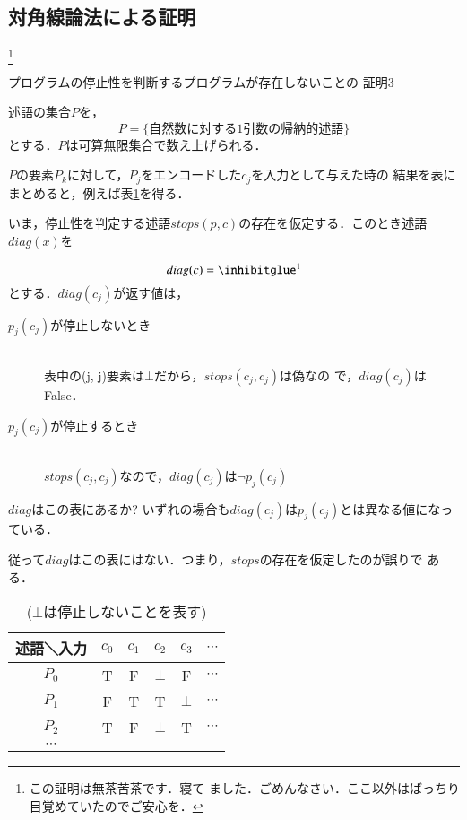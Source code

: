 \subsection{対角線論法による証明} \footnote{この証明は無茶苦茶です．寝て
ました．ごめんなさい．ここ以外はばっちり目覚めていたのでご安心を．}
\begin{myproof}{プログラムの停止性を判断するプログラムが存在しないことの
 証明3}
 \footnotemark

述語の集合$P$を，
\[
 P = \{自然数に対する1引数の帰納的述語\}
\]
とする．$P$は可算無限集合で数え上げられる．

$P$の要素$P_k$に対して，$P_j$をエンコードした$c_j$を入力として与えた時の
結果を表にまとめると，例えば表\ref{tb:07taikaku}を得る．

いま，停止性を判定する述語$stops(p,c)$の存在を仮定する．このとき述語
$diag(x)$を

\[
 diag(c) = \footnotemark
\]
とする．$diag(c_j)$が返す値は，
\begin{description}
 \item[$p_j (c_j)$が停止しないとき] \mbox{} \\
            表中の(j, j)要素は$\bot$だから，$stops(c_j,c_j)$は偽なの
            で，$diag(c_j)$はFalse．
 \item[$p_j(c_j)$が停止するとき] \mbox{} \\
            $stops(c_j, c_j)$なので，$diag(c_j)$は$\neg p_j(c_j)$
\end{description}
$diag$はこの表にあるか?
いずれの場合も$diag(c_j)$は$p_j(c_j)$とは異なる値になっている．

従って$diag$はこの表にはない．つまり，$stops$の存在を仮定したのが誤りで
ある．
\end{myproof}

\begin{table}
 \caption{($\bot$は停止しないことを表す)}
 \begin{center}
  \begin{tabular}{c|c|c|c|c|c}
   \hline
   述語＼入力 &$c_0$&$c_1$&$c_2$&$c_3$&$\cdots$\\
    \hline \hline
   $P_0$ &T&F&$\bot$&F&$\cdots$\\ \hline
   $P_1$ &F&T&T&$\bot$&$\cdots$\\ \hline
   $P_2$ &T&F&$\bot$&T&$\cdots$\\ \hline
   $\cdots$ &&&&&\\ \hline
  \end{tabular}
  \label{tb:07taikaku}
 \end{center}
\end{table}


